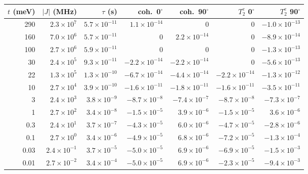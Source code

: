 \begin{tabular}{rrrrrrr}
\toprule
$t$ (meV) & $|J|$ (MHz) & $\tau$ (s) & coh.\ 0$^\circ$ & coh.\ 90$^\circ$ & $T_2^e$ 0$^\circ$ & $T_2^e$ 90$^\circ$ \\
\midrule
290 & $\ensuremath{2.3\times10^{7}}$ & $\ensuremath{5.7\times10^{-11}}$ & $\ensuremath{1.1\times10^{-14}}$ & $0$ & $0$ & $\ensuremath{-1.0\times10^{-13}}$ \\
160 & $\ensuremath{7.0\times10^{6}}$ & $\ensuremath{5.7\times10^{-11}}$ & $0$ & $\ensuremath{2.2\times10^{-14}}$ & $0$ & $\ensuremath{-8.9\times10^{-14}}$ \\
100 & $\ensuremath{2.7\times10^{6}}$ & $\ensuremath{5.9\times10^{-11}}$ & $0$ & $0$ & $0$ & $\ensuremath{-1.3\times10^{-13}}$ \\
30 & $\ensuremath{2.4\times10^{5}}$ & $\ensuremath{9.3\times10^{-11}}$ & $\ensuremath{-2.2\times10^{-14}}$ & $\ensuremath{-2.2\times10^{-14}}$ & $0$ & $\ensuremath{-5.6\times10^{-13}}$ \\
22 & $\ensuremath{1.3\times10^{5}}$ & $\ensuremath{1.3\times10^{-10}}$ & $\ensuremath{-6.7\times10^{-14}}$ & $\ensuremath{-4.4\times10^{-14}}$ & $\ensuremath{-2.2\times10^{-14}}$ & $\ensuremath{-1.3\times10^{-12}}$ \\
10 & $\ensuremath{2.7\times10^{4}}$ & $\ensuremath{3.9\times10^{-10}}$ & $\ensuremath{-1.6\times10^{-11}}$ & $\ensuremath{-1.8\times10^{-11}}$ & $\ensuremath{-1.6\times10^{-11}}$ & $\ensuremath{-3.5\times10^{-11}}$ \\
3 & $\ensuremath{2.4\times10^{3}}$ & $\ensuremath{3.8\times10^{-9}}$ & $\ensuremath{-8.7\times10^{-8}}$ & $\ensuremath{-7.4\times10^{-7}}$ & $\ensuremath{-8.7\times10^{-8}}$ & $\ensuremath{-7.3\times10^{-7}}$ \\
1 & $\ensuremath{2.7\times10^{2}}$ & $\ensuremath{3.4\times10^{-8}}$ & $\ensuremath{-1.5\times10^{-5}}$ & $\ensuremath{3.9\times10^{-6}}$ & $\ensuremath{-1.5\times10^{-5}}$ & $\ensuremath{3.6\times10^{-6}}$ \\
0.3 & $\ensuremath{2.4\times10^{1}}$ & $\ensuremath{3.7\times10^{-7}}$ & $\ensuremath{-4.3\times10^{-5}}$ & $\ensuremath{6.0\times10^{-6}}$ & $\ensuremath{-4.7\times10^{-5}}$ & $\ensuremath{-2.8\times10^{-6}}$ \\
0.1 & $\ensuremath{2.7\times10^{0}}$ & $\ensuremath{3.4\times10^{-6}}$ & $\ensuremath{-4.9\times10^{-5}}$ & $\ensuremath{6.8\times10^{-6}}$ & $\ensuremath{-7.2\times10^{-5}}$ & $\ensuremath{-1.3\times10^{-4}}$ \\
0.03 & $\ensuremath{2.4\times10^{-1}}$ & $\ensuremath{3.7\times10^{-5}}$ & $\ensuremath{-5.0\times10^{-5}}$ & $\ensuremath{6.9\times10^{-6}}$ & $\ensuremath{-6.9\times10^{-5}}$ & $\ensuremath{-1.5\times10^{-3}}$ \\
0.01 & $\ensuremath{2.7\times10^{-2}}$ & $\ensuremath{3.4\times10^{-4}}$ & $\ensuremath{-5.0\times10^{-5}}$ & $\ensuremath{6.9\times10^{-6}}$ & $\ensuremath{-2.3\times10^{-5}}$ & $\ensuremath{-9.4\times10^{-3}}$ \\
\bottomrule
\end{tabular}
